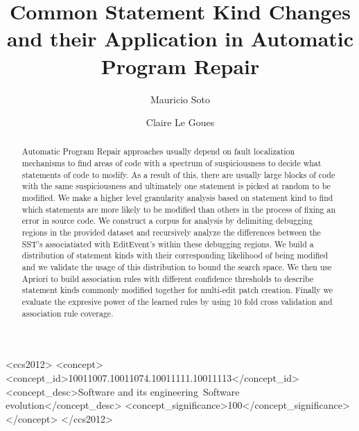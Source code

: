 \documentclass[sigconf]{acmart}
\begin{document}
\title{Common Statement Kind Changes and their Application in Automatic Program Repair}


\author{Mauricio Soto}

\author{Claire Le Goues}




\begin{abstract}
Automatic Program Repair approaches usually depend on fault localization
mechanisms to find areas of code with a spectrum of suspiciousness to 
decide what statements of code to modify. As a result of this, there
are usually large blocks of code with the same suspiciousness and 
ultimately one statement is picked at random to be modified.
We make a higher level granularity analysis based on statement kind
to find which statements are more likely to be modified than others
in the process of fixing an error in source code.
We construct a corpus for analysis by 
delimiting debugging regions in the provided dataset and 
recursively analyze the
differences between the SST's associatiated with EditEvent's
within these debugging regions. 
We build a distribution of statement kinds with their corresponding
likelihood of being modified and we validate the usage of this 
distribution to bound the search space.
We then use Apriori to build association rules with different
confidence thresholds to describe statement kinds commonly modified
together for multi-edit patch creation. Finally
we evaluate the expresive power of the learned rules by
using 10 fold cross validation and association rule coverage. 


\end{abstract}

%
%
\begin{CCSXML}
<ccs2012>
<concept>
<concept_id>10011007.10011074.10011111.10011113</concept_id>
<concept_desc>Software and its engineering~Software evolution</concept_desc>
<concept_significance>100</concept_significance>
</concept>
</ccs2012>
\end{CCSXML}
\end{document}
